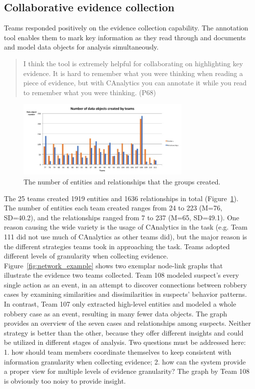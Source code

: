 \subsection{Collaborative evidence collection}

Teams responded positively on the evidence collection capability. The annotation tool enables them to mark key information as they read through and documents and model data objects for analysis simultaneously. 

\begin{quote}
	I think the tool is extremely helpful for collaborating on highlighting key evidence. It is hard to remember what you were thinking when reading a piece of evidence, but with CAnalytics you can annotate it while you read to remember what you were thinking. (P68)
\end{quote}

\begin{figure}
	\centering
	\includegraphics[height=1.5in]{img/user_created_objects}
	\caption{The number of entities and relationships that the groups created.}
	\label{fig:user_created_objects}
\end{figure}

The 25 teams created 1919 entities and 1636 relationships in total (Figure~\ref{fig:user_created_objects}). The number of entities each team created ranges from 24 to 223 (M=76, SD=40.2), and the relationships ranged from 7 to 237 (M=65, SD=49.1). One reason causing the wide variety is the usage of CAnalytics in the task (e.g. Team 111 did not use much of CAnalytics as other teams did), but the major reason is the different strategies teams took in approaching the task. Teams adopted different levels of granularity when collecting evidence. Figure~\ref{fig:network_example} shows two exemplar node-link graphs that illustrate the evidence two teams collected. Team 108 modeled suspect's every single action as an event, in an attempt to discover connections between robbery cases by examining similarities and dissimilarities in suspects' behavior patterns. In contrast, Team 107 only extracted high-level entities and modeled a whole robbery case as an event, resulting in many fewer data objects. The graph provides an overview of the seven cases and relationships among suspects. Neither strategy is better than the other, because they offer different insights and could be utilized in different stages of analysis. Two questions must be addressed here: 1. how should team members coordinate themselves to keep consistent with information granularity when collecting evidence; 2. how can the system provide a proper view for multiple levels of evidence granularity? The graph by Team 108 is obviously too noisy to provide insight. 

